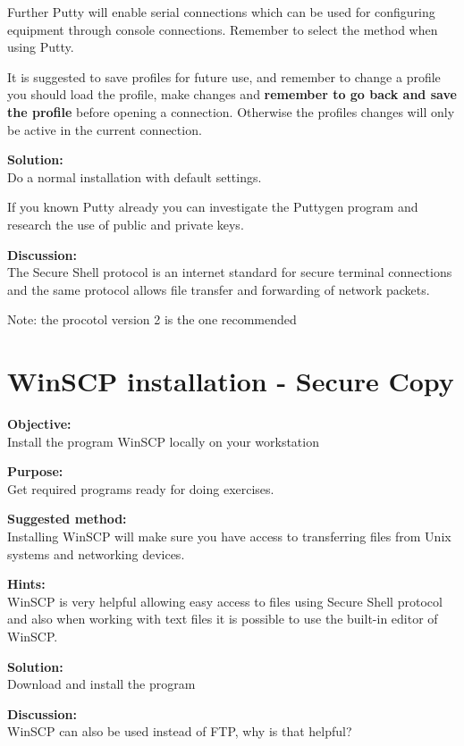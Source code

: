 \documentclass[a4paper,11pt,notitlepage]{report}
\begin{document}
Further Putty will enable serial connections which can be used for configuring
equipment through console connections. Remember to select the method
when using Putty.

It is suggested to save profiles for future use, and remember to change a
profile you should load the profile, make changes and {\bf remember to go back
and save the profile} before opening a connection. Otherwise the profiles changes
will only be active in the current connection.

{\bf Solution:}\\
Do a normal installation with default settings.

If you known Putty already you can investigate the Puttygen program and
research the use of public and private keys.

{\bf Discussion:}\\
The Secure Shell protocol is an internet standard for secure terminal connections
and the same protocol allows file transfer and forwarding of network packets.

Note: the procotol version 2 is the one recommended

\chapter{WinSCP installation - Secure Copy}
\label{ex:winscp-install}


{\bf Objective:}\\
Install the program WinSCP locally on your workstation


{\bf Purpose:}\\
Get required programs ready for doing exercises.

{\bf Suggested method:}\\
Installing WinSCP will make sure you have access to transferring files from Unix systems and networking devices.


{\bf Hints:}\\
WinSCP is very helpful allowing easy access to files using Secure Shell protocol
and also when working with text files it is possible to use the built-in editor
of WinSCP.

{\bf Solution:}\\
Download and install the program

{\bf Discussion:}\\
WinSCP can also be used instead of FTP, why is that helpful?
\end{document}
